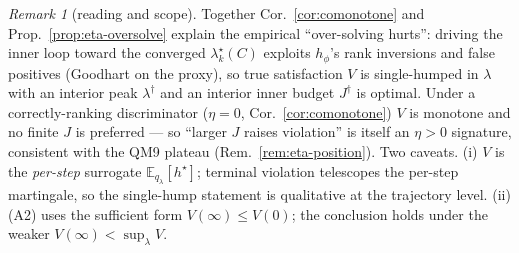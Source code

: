 \documentclass[11pt]{article}
\newcommand{\E}{\mathbb{E}}
\newcommand{\hs}{h^\star}
\theoremstyle{plain}
\theoremstyle{definition}
\theoremstyle{remark}
\newtheorem{remark}{Remark}
\begin{document}
\begin{remark}[reading and scope]
\label{rem:oversolve-scope}
Together Cor.~\ref{cor:comonotone} and Prop.~\ref{prop:eta-oversolve} explain the empirical
``over-solving hurts'': driving the inner loop toward the converged $\lambda^\star_k(C)$ exploits
$h_\phi$'s rank inversions and false positives (Goodhart on the proxy), so true satisfaction $V$
is single-humped in $\lambda$ with an interior peak $\lambda^\dagger$ and an interior inner budget
$J^\dagger$ is optimal. Under a correctly-ranking discriminator ($\eta=0$, Cor.~\ref{cor:comonotone})
$V$ is monotone and no finite $J$ is preferred --- so ``larger $J$ raises violation'' is itself an
$\eta>0$ signature, consistent with the QM9 plateau (Rem.~\ref{rem:eta-position}). Two caveats.
\textup{(i)} $V$ is the \emph{per-step} surrogate $\E_{q_\lambda}[\hs]$; terminal violation
telescopes the per-step martingale, so the single-hump statement is qualitative at the trajectory
level. \textup{(ii)} (A2) uses the sufficient form $V(\infty)\le V(0)$; the conclusion holds under
the weaker $V(\infty)<\sup_\lambda V$.
\end{remark}
\end{document}
